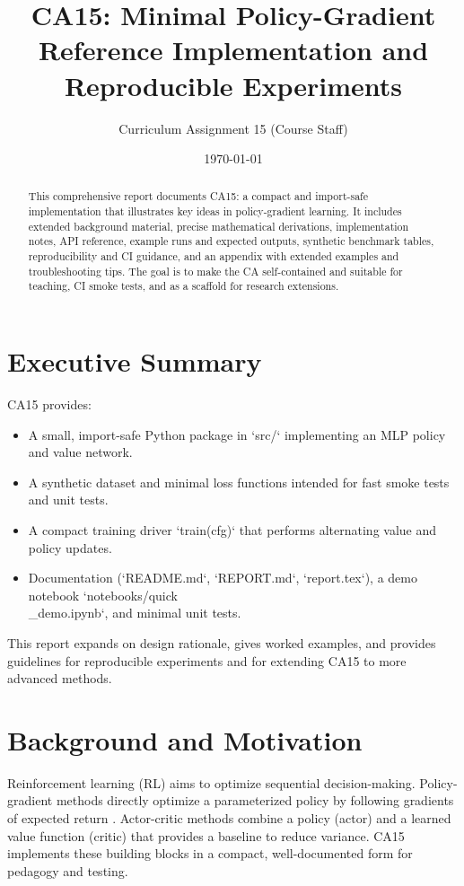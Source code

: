 \documentclass[11pt,a4paper]{article}
\title{CA15: Minimal Policy-Gradient Reference Implementation and Reproducible Experiments}
\author[1]{Curriculum Assignment 15 (Course Staff)}
\affil[1]{Department / Course}
\date{\today}
\begin{document}
\maketitle
\begin{abstract}
This comprehensive report documents CA15: a compact and import-safe implementation that illustrates key ideas in policy-gradient learning. It includes extended background material, precise mathematical derivations, implementation notes, API reference, example runs and expected outputs, synthetic benchmark tables, reproducibility and CI guidance, and an appendix with extended examples and troubleshooting tips. The goal is to make the CA self-contained and suitable for teaching, CI smoke tests, and as a scaffold for research extensions.
\end{abstract}

\tableofcontents
\newpage

\section{Executive Summary}
CA15 provides:
\begin{itemize}
  \item A small, import-safe Python package in `src/` implementing an MLP policy and value network.
  \item A synthetic dataset and minimal loss functions intended for fast smoke tests and unit tests.
  \item A compact training driver `train(cfg)` that performs alternating value and policy updates.
  \item Documentation (`README.md`, `REPORT.md`, `report.tex`), a demo notebook `notebooks/quick\\_demo.ipynb`, and minimal unit tests.
\end{itemize}
This report expands on design rationale, gives worked examples, and provides guidelines for reproducible experiments and for extending CA15 to more advanced methods.

\section{Background and Motivation}
Reinforcement learning (RL) aims to optimize sequential decision-making. Policy-gradient methods directly optimize a parameterized policy by following gradients of expected return \cite{williams1992simple, sutton1998reinforcement}. Actor-critic methods combine a policy (actor) and a learned value function (critic) that provides a baseline to reduce variance. CA15 implements these building blocks in a compact, well-documented form for pedagogy and testing.
\end{document}
